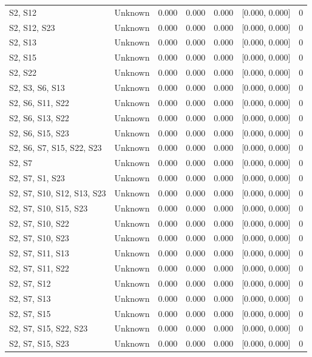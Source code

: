 \begin{table}[h]
\begin{tabular}{llccccr}
S2, S12 & Unknown & 0.000 & 0.000 & 0.000 & [0.000, 0.000] & 0 \\
S2, S12, S23 & Unknown & 0.000 & 0.000 & 0.000 & [0.000, 0.000] & 0 \\
S2, S13 & Unknown & 0.000 & 0.000 & 0.000 & [0.000, 0.000] & 0 \\
S2, S15 & Unknown & 0.000 & 0.000 & 0.000 & [0.000, 0.000] & 0 \\
S2, S22 & Unknown & 0.000 & 0.000 & 0.000 & [0.000, 0.000] & 0 \\
S2, S3, S6, S13 & Unknown & 0.000 & 0.000 & 0.000 & [0.000, 0.000] & 0 \\
S2, S6, S11, S22 & Unknown & 0.000 & 0.000 & 0.000 & [0.000, 0.000] & 0 \\
S2, S6, S13, S22 & Unknown & 0.000 & 0.000 & 0.000 & [0.000, 0.000] & 0 \\
S2, S6, S15, S23 & Unknown & 0.000 & 0.000 & 0.000 & [0.000, 0.000] & 0 \\
S2, S6, S7, S15, S22, S23 & Unknown & 0.000 & 0.000 & 0.000 & [0.000, 0.000] & 0 \\
S2, S7 & Unknown & 0.000 & 0.000 & 0.000 & [0.000, 0.000] & 0 \\
S2, S7, S1, S23 & Unknown & 0.000 & 0.000 & 0.000 & [0.000, 0.000] & 0 \\
S2, S7, S10, S12, S13, S23 & Unknown & 0.000 & 0.000 & 0.000 & [0.000, 0.000] & 0 \\
S2, S7, S10, S15, S23 & Unknown & 0.000 & 0.000 & 0.000 & [0.000, 0.000] & 0 \\
S2, S7, S10, S22 & Unknown & 0.000 & 0.000 & 0.000 & [0.000, 0.000] & 0 \\
S2, S7, S10, S23 & Unknown & 0.000 & 0.000 & 0.000 & [0.000, 0.000] & 0 \\
S2, S7, S11, S13 & Unknown & 0.000 & 0.000 & 0.000 & [0.000, 0.000] & 0 \\
S2, S7, S11, S22 & Unknown & 0.000 & 0.000 & 0.000 & [0.000, 0.000] & 0 \\
S2, S7, S12 & Unknown & 0.000 & 0.000 & 0.000 & [0.000, 0.000] & 0 \\
S2, S7, S13 & Unknown & 0.000 & 0.000 & 0.000 & [0.000, 0.000] & 0 \\
S2, S7, S15 & Unknown & 0.000 & 0.000 & 0.000 & [0.000, 0.000] & 0 \\
S2, S7, S15, S22, S23 & Unknown & 0.000 & 0.000 & 0.000 & [0.000, 0.000] & 0 \\
S2, S7, S15, S23 & Unknown & 0.000 & 0.000 & 0.000 & [0.000, 0.000] & 0 \\

\end{tabular}
\end{table}
